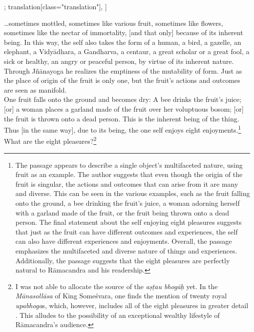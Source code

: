 \begin{alignment}[
  texts=edition[class="edition"];
  translation[class="translation"],
  ]
\begin{translation}
\begin{tlate}[p22_02]
      \ldots sometimes mottled, sometimes like various fruit, sometimes like flowers, sometimes like the nectar of immortality, [and that only] because of its inherent being. In this way, the self also takes the form of a human, a bird, a gazelle, an elephant, a Vidyādhara, a Gandharva, a centaur, a great scholar or a great fool, a sick or healthy, an angry or peaceful person, by virtue of its inherent nature. Through Jñānayoga he realizes the emptiness of the mutability of form. Just as the place of origin of the fruit is only one, but the fruit's actions and outcomes are seen as manifold.\\

      One fruit falls onto the ground and becomes dry: A bee drinks the fruit's juice; [or] a woman places a garland made of the fruit over her voluptuous bosom; [or] the fruit is thrown onto a dead person. This is the inherent being of the thing. Thus [in the same way], due to its being, the one self enjoys eight enjoyments.\footnote{The passage appears to describe a single object's multifaceted nature, using fruit as an example. The author suggests that even though the origin of the fruit is singular, the actions and outcomes that can arise from it are many and diverse. This can be seen in the various examples, such as the fruit falling onto the ground, a bee drinking the fruit's juice, a woman adorning herself with a garland made of the fruit, or the fruit being thrown onto a dead person. The final statement about the self enjoying eight pleasures suggests that just as the fruit can have different outcomes and experiences, the self can also have different experiences and enjoyments. Overall, the passage emphasizes the multifaceted and diverse nature of things and experiences. Additionally, the passage suggests that the eight pleasures are perfectly natural to Rāmacandra and his readership.}
\\
What are the eight pleasures?\footnote{I was not able to allocate the source of the \textit{aṣṭau bhogāḥ} yet. In the \textit{Mānasollāsa} of King Someśvara, one finds the mention of twenty royal \textit{upabhoga}s, which, however, includes all of the eight pleasures in greater detail \parencite[5]{manasollasa}. This alludes to the possibility of an exceptional wealthy lifestyle of Rāmacandra's audience.}
\end{tlate}
\begin{tlate}[22_1]

\end{tlate}
\end{translation}
\end{alignment}
